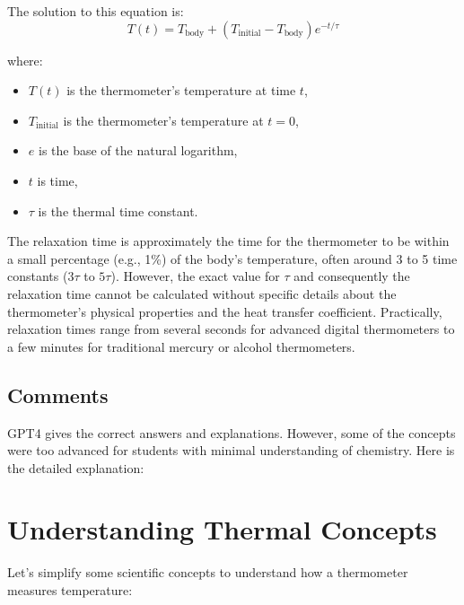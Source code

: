 \documentclass[12pt]{article}
\begin{document}
The solution to this equation is:
\[
T(t) = T_{\text{body}} + (T_{\text{initial}} - T_{\text{body}}) e^{-t/\tau}
\]

where:
\begin{itemize}
    \item \( T(t) \) is the thermometer’s temperature at time \( t \),
    \item \( T_{\text{initial}} \) is the thermometer’s temperature at \( t = 0 \),
    \item \( e \) is the base of the natural logarithm,
    \item \( t \) is time,
    \item \( \tau \) is the thermal time constant.
\end{itemize}

The relaxation time is approximately the time for the thermometer to be within a small percentage (e.g., 1\%) of the body's temperature, often around 3 to 5 time constants (\( 3\tau \) to \( 5\tau \)). However, the exact value for \( \tau \) and consequently the relaxation time cannot be calculated without specific details about the thermometer's physical properties and the heat transfer coefficient. Practically, relaxation times range from several seconds for advanced digital thermometers to a few minutes for traditional mercury or alcohol thermometers.

\subsection*{Comments}

GPT4 gives the correct answers and explanations. However, some of the concepts were too advanced for students with minimal understanding of chemistry. Here is the detailed explanation:

\section*{Understanding Thermal Concepts}

Let's simplify some scientific concepts to understand how a thermometer measures temperature:
\end{document}
